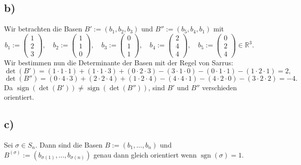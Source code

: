 \documentclass{article}
\DeclareMathOperator{\sign}{sign}
\DeclareMathOperator{\sgn}{sgn}
\begin{document}
\subsection*{b)}
Wir betrachten die Basen
$B' := (b_1 , b_2 , b_3)$
und
$B'' := (b_5 , b_4 , b_1)$
mit
\[
b_1 := \begin{pmatrix} 1 \\ 2 \\ 3 \end{pmatrix}, \quad
b_2 := \begin{pmatrix} 1 \\ 1 \\ 0 \end{pmatrix}, \quad
b_3 := \begin{pmatrix} 0 \\ 1 \\ 1 \end{pmatrix}, \quad
b_4 := \begin{pmatrix} 2 \\ 4 \\ 4 \end{pmatrix}, \quad
b_5 := \begin{pmatrix} 0 \\ 2 \\ 4 \end{pmatrix} \in \mathbb{R}^3.
\]
Wir bestimmen nun die Determinante der Basen
mit der Regel von Sarrus:
\[
\det(B')
=
(1 \cdot 1 \cdot 1) + (1 \cdot 1 \cdot 3)
  + (0 \cdot 2 \cdot 3) - (3 \cdot 1 \cdot 0) - (0 \cdot 1
  \cdot 1) - (1 \cdot 2 \cdot 1)
= 2,
\]
\[
\det(B'')
=
(0 \cdot 4 \cdot 3) + (2 \cdot 2 \cdot 4)
  + (1 \cdot 2 \cdot 4) - (4 \cdot 4 \cdot 1) - (4 \cdot 2
  \cdot 0) - (3 \cdot 2 \cdot 2)
= -4.
\]
Da $\sign(\det(B')) \neq \sign(\det(B''))$,
sind $B'$ und $B''$ verschieden orientiert.


\subsection*{c)}
Sei $\sigma \in S_n$.
Dann sind die Basen $B := (b_1, \ldots, b_n)$
und $B^{(\sigma)} := (b_{\sigma(1)}, \ldots, b_{\sigma(n)})$
genau dann gleich orientiert wenn 
$\sgn(\sigma) = 1$.
\end{document}
